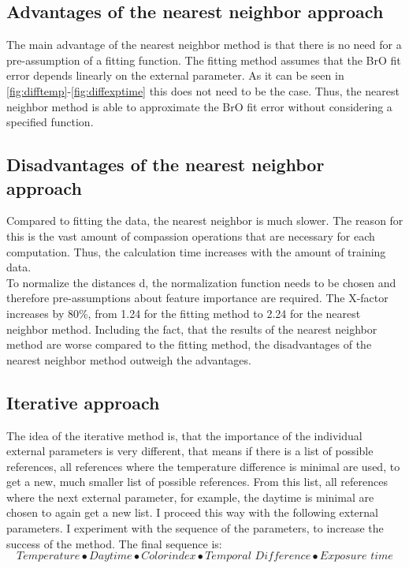 \documentclass  [
  paper    = a4,
  BCOR     = 10mm,
  twoside,
  fontsize = 12pt,
  fleqn,
  toc      = bibnumbered,
  toc      = listofnumbered,
  numbers  = noendperiod,
  headings = normal,
  listof   = leveldown,
  version  = 3.03
]                                       {scrreprt}
\begin{document}
%

\subsection*{Advantages of the nearest neighbor approach}
The main advantage of the nearest neighbor method is that there is no need for a pre-assumption of a fitting function. The fitting method assumes that the BrO fit error depends linearly on the external parameter. As it can be seen in \cref{fig:difftemp}-\cref{fig:diffexptime} this does not need to be the case. Thus, the nearest neighbor method is able to approximate the BrO fit error without considering a specified function.
%
\subsection*{Disadvantages of the nearest neighbor approach}
Compared to fitting the data, the nearest neighbor is much slower. The reason for this is the vast amount of compassion operations that are necessary for each computation. Thus, the calculation time increases with the amount of training data.\\
To normalize the distances d, the normalization function needs to be chosen and therefore pre-assumptions about feature importance are required.
The X-factor increases by 80\%, from 1.24 for the fitting method 
to 2.24 for the nearest neighbor method.
Including the fact, that the results of the nearest neighbor method are worse compared to the fitting method, the disadvantages of the nearest neighbor method outweigh the advantages.

\subsection{Iterative approach}

The idea of the iterative method is, that the importance of the individual external parameters is very different, that means if there is a list of possible references, all references where the temperature difference is minimal are used, to get a new, much smaller list of possible references. From this list, all references where the next external parameter, for example, the daytime is minimal are chosen to again get a new list. I proceed this way with the following external parameters. I experiment with the sequence of the parameters, to increase the success of the method. The final sequence is:
\begin{equation*}
Temperature \bullet  Daytime  \bullet Colorindex \bullet Temporal\,\, Difference \bullet Exposure \,\, time
\end{equation*} 
\end{document}
